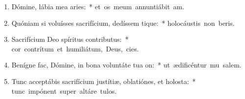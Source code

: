 \begin{flushleft}
\begin{enumerate}[leftmargin=*]
\item Dómine, lábia mea aries:~* \mbox{et os meum annuntiábit  am.}
\item Quóniam si voluísses sacrifícium, dedíssem tique:~* \mbox{holocáustis non beris.}
\item Sacrifícium Deo spíritus contributus:~* \mbox{cor contrítum et humiliátum, Deus,  cies.}
\item Benígne fac, Dómine, in bona voluntáte tua on:~* \mbox{ut ædificéntur mu salem.}
\item Tunc acceptábis sacrifícium justítiæ, oblatiónes, et holosta:~* \mbox{tunc impónent super altáre  tulos.}

\end{enumerate}
\end{flushleft}

